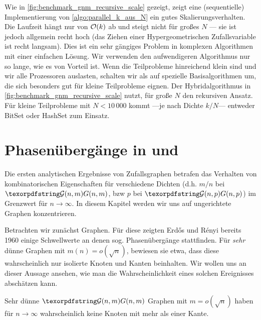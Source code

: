 Wie in \cref{fig:benchmark_gnm_recursive_scale} gezeigt, zeigt eine (sequentielle) Implementierung von \cref{algo:parallel_k_aus_N} ein gutes Skalierungsverhalten.
Die Laufzeit hängt nur von $\mathcal{O}\!\left(k\right)$ ab und steigt nicht für großes $N$ --- sie ist jedoch allgemein recht hoch (das Ziehen einer Hypergeometrischen Zufallsvariable ist recht langsam).
Dies  ist ein sehr gängiges Problem in komplexen Algorithmen mit einer einfachen Lösung.
Wir verwenden den aufwendigeren Algorithmus nur so lange, wie es von Vorteil ist.
Wenn die Teilprobleme hinreichend klein sind und wir alle Prozessoren auslasten, schalten wir als  auf spezielle Basisalgorithmen um, die sich besonders gut für kleine Teilprobleme eignen.
Der Hybridalgorithmus in \cref{fig:benchmark_gnm_recursive_scale} nutzt, für große $N$ den rekursiven Ansatz.
Für kleine Teilprobleme mit $N < 10\,000$ kommt  ---je nach Dichte $k/N$--- entweder BitSet oder HashSet zum Einsatz.

\section{Phasenübergänge in \Gnp und \Gnm}
Die ersten analytischen Ergebnisse von Zufallsgraphen betrafen das Verhalten von kombinatorischen Eigenschaften für verschiedene Dichten (d.h. $m/n$ bei $\Gnm$, bzw $p$ bei $\Gnp$) im Grenzwert für $n \to \infty$.
In  diesem Kapitel werden wir uns auf ungerichtete Graphen konzentrieren.

Betrachten wir zunächst \Gnm Graphen.
Für diese zeigten Erd\H{o}s und R\'enyi bereits 1960 einige Schwellwerte an denen sog. Phasenübergänge stattfinden.
Für \emph{sehr} dünne Graphen mit $m(n) = o(\sqrt n)$, bewiesen sie etwa, dass diese wahrscheinlich nur isolierte Knoten und Kanten beinhalten.
Wir wollen uns an dieser Aussage ansehen, wie man die Wahrscheinlichkeit eines solchen Ereignisses abschätzen kann.

\begin{lemma}
    Sehr dünne $\Gnm$ Graphen mit $m = o(\sqrt n)$ haben für $n \to \infty$ wahrscheinlich keine Knoten mit mehr als einer Kante.
\end{lemma}

